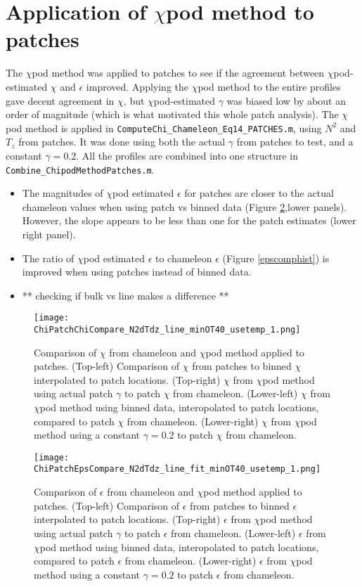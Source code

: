 \documentclass[11pt]{article}
\begin{document}
\clearpage
\section{Application of $\chi$pod method to patches}

The $\chi$pod method was applied to patches to see if the agreement between $\chi$pod-estimated $\chi$ and $\epsilon$ improved. Applying the $\chi$pod method to the entire profiles gave decent agreement in $\chi$, but $\chi$pod-estimated $\gamma$ was biased low by about an order of magnitude (which is what motivated this whole patch analysis).  The $\chi$pod method is applied in \verb+ComputeChi_Chameleon_Eq14_PATCHES.m+, using $N^2$ and $T_z$ from patches. It was done using both the actual $\gamma$ from patches to test, and a constant $\gamma=0.2$. All the profiles are combined into one structure in \verb+Combine_ChipodMethodPatches.m+.

\begin{itemize}
\item The magnitudes of $\chi$pod estimated $\epsilon$ for patches are closer to the actual chameleon values when using patch vs binned data (Figure \ref{epscomp2d},lower panels). However, the slope appears to be less than one for the patch estimates (lower right panel).
\item The ratio of $\chi$pod estimated $\epsilon$ to chameleon $\epsilon$ (Figure \ref{epscomphist}) is improved when using patches instead of binned data. 
\item ** checking if bulk vs line makes a difference **
\end{itemize}

\begin{figure}[htbp]
\texttt{[image: ChiPatchChiCompare\_N2dTdz\_line\_minOT40\_usetemp\_1.png]}
\caption{Comparison of $\chi$ from chameleon and $\chi$pod method applied to patches. (Top-left) Comparison of $\chi$ from patches to binned $\chi$ interpolated to patch locations. (Top-right) $\chi$ from $\chi$pod method using actual patch $\gamma$ to patch $\chi$ from chameleon. (Lower-left) $\chi$ from $\chi$pod method using binned data, interopolated to patch locations, compared to patch $\chi$ from chameleon. (Lower-right) $\chi$ from $\chi$pod method using a constant $\gamma=0.2$ to patch $\chi$ from chameleon.}
\label{chicomp2d}
\end{figure}


\begin{figure}[htbp]
\texttt{[image: ChiPatchEpsCompare\_N2dTdz\_line\_fit\_minOT40\_usetemp\_1.png]}
\caption{Comparison of $\epsilon$ from chameleon and $\chi$pod method applied to patches. (Top-left) Comparison of $\epsilon$ from patches to binned $\epsilon$ interpolated to patch locations. (Top-right) $\epsilon$ from $\chi$pod method using actual patch $\gamma$ to patch $\epsilon$ from chameleon. (Lower-left) $\epsilon$ from $\chi$pod method using binned data, interopolated to patch locations, compared to patch $\epsilon$ from chameleon. (Lower-right) $\epsilon$ from $\chi$pod method using a constant $\gamma=0.2$ to patch $\epsilon$ from chameleon.}
\label{epscomp2d}
\end{figure}
\end{document}
